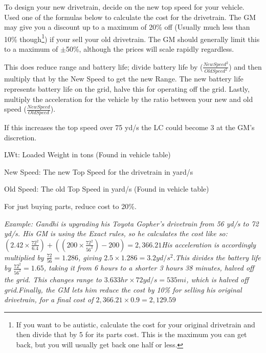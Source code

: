 \begin{multicols*}{2}
	To design your new drivetrain, decide on the new top speed for your vehicle. Used one of the formulas below to calculate the cost for the drivetrain. The GM may give you a discount up to a maximum of 20\% off (Usually much less than 10\% though\footnote{If you want to be autistic, calculate the cost for your original drivetrain and then divide that by 5 for its parts cost. This is the maximum you can get back, but you will usually get back one half or less.}) if your sell your old drivetrain. The GM should generally limit this to a maximum of $\pm$50\%, although the prices will scale rapidly regardless.
	
	This does reduce range and battery life; divide battery life by ($\frac{New Speed^2}{Old Speed^2}$) and then multiply that by the New Speed to get the new Range. The new battery life represents battery life on the grid, halve this for operating off the grid. Lastly, multiply the acceleration for the vehicle by the ratio between your new and old speed ($\frac{New Speed}{Old Speed}$).
	
	If this increases the top speed over 75 yd/s the LC could become 3 at the GM's discretion.
		
	
	LWt: Loaded Weight in tons (Found in vehicle table)
	
	New Speed: The new Top Speed for the drivetrain in yard/s
	
	Old Speed: The old Top Speed in yard/s (Found in vehicle table)
	
	For just buying parts, reduce cost to 20\%.
	
	\textcolor{OliveGreen}{\textit{Example: Gandhi is upgrading his Toyota Gopher's drivetrain from 56 yd/s to 72 yd/s. His GM is using the Exact rules, so he calculates the cost like so: \newline$(2.42 \times \frac{72^2}{6.4}) + ((200 \times \frac{ 72^2}{56^2}) - 200) = 2,366.21$\newline His acceleration is accordingly multiplied by $\frac{72}{56}=1.286$, giving $2.5\times1.286 = 3.2 yd/s^2$.\newline This divides the battery life by $\frac{72^2}{56^2} = 1.65$, taking it from 6 hours to a shorter 3 hours 38 minutes, halved off the grid. This changes range to $3.633 hr\times72 yd/s = 535 mi$, which is halved off grid.\newline Finally, the GM lets him reduce the cost by 10\% for selling his original drivetrain, for a final cost of $2,366.21\times0.9 = 2,129.59$}}
	

\end{multicols*}
